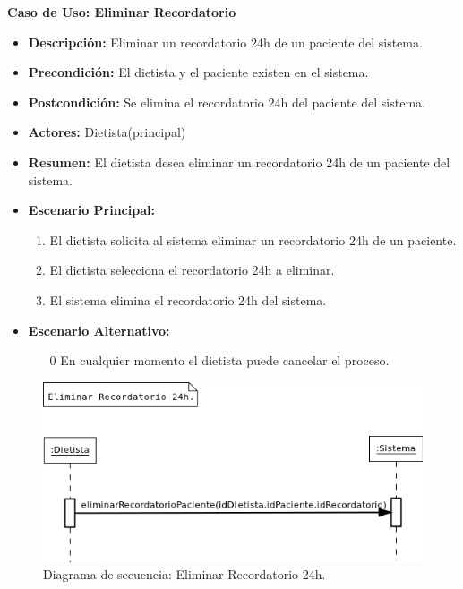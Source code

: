 \textbf{Caso de Uso: Eliminar Recordatorio}
\begin{itemize}
\item \textbf{Descripción:} Eliminar un recordatorio 24h de un paciente del sistema.
\item \textbf{Precondición:} El dietista y el paciente existen en el sistema.
\item \textbf{Postcondición:} Se elimina el recordatorio 24h del paciente del sistema.
\item \textbf{Actores:} Dietista(principal)
\item \textbf{Resumen:} El dietista desea eliminar un recordatorio 24h de un paciente del sistema.
\item \textbf{Escenario Principal:}
\begin{enumerate}
\item El dietista solicita al sistema eliminar un recordatorio 24h de un paciente.
\item El dietista selecciona el recordatorio 24h a eliminar.
\item El sistema elimina el recordatorio 24h del sistema.
\end{enumerate}
\item \textbf{Escenario Alternativo:}
\begin{enumerate}
\item[0] En cualquier momento el dietista puede cancelar el proceso.
\end{enumerate}
\end{itemize}
\begin{figure}[H]
  \label{ds_eliminarrecordatorio}
  \begin{center}
    \includegraphics[scale=0.7]{../img/DS_EliminarRecordatorio.png}
  \end{center}
  \caption{Diagrama de secuencia: Eliminar Recordatorio 24h.}
\end{figure}

